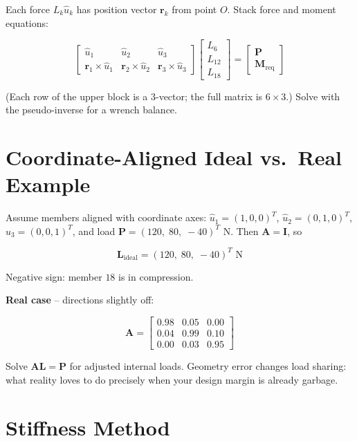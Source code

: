 \documentclass[11pt, letterpaper]{article}
\newcommand{\bL}{\mathbf{L}}
\newcommand{\bA}{\mathbf{A}}
\newcommand{\bP}{\mathbf{P}}
\begin{document}
Each force $L_k\hat{u}_k$ has position vector $\mathbf{r}_k$ from point $O$.
Stack force and moment equations:

\[
\begin{bmatrix}
  \hat{u}_1 & \hat{u}_2 & \hat{u}_3 \\[4pt]
  \mathbf{r}_1\times\hat{u}_1 & \mathbf{r}_2\times\hat{u}_2 & \mathbf{r}_3\times\hat{u}_3
\end{bmatrix}
\begin{bmatrix} L_6 \\ L_{12} \\ L_{18} \end{bmatrix}
=
\begin{bmatrix} \bP \\ \mathbf{M}_{\mathrm{req}} \end{bmatrix}
\]

\noindent
(Each row of the upper block is a $3$-vector; the full matrix is $6\times3$.)
Solve with the pseudo-inverse for a wrench balance.

\section{Coordinate-Aligned Ideal vs.\ Real Example}

Assume members aligned with coordinate axes:
$\hat{u}_1=(1,0,0)^T$, $\hat{u}_2=(0,1,0)^T$, $\hat{u}_3=(0,0,1)^T$, and load
$\bP=(120,\;80,\;-40)^T$ N. Then $\bA = \mathbf{I}$, so

\[
\bL_{\mathrm{ideal}} = (120,\;80,\;-40)^T \text{ N}
\]

\noindent
Negative sign: member $18$ is in compression.

\medskip\noindent
\textbf{Real case} -- directions slightly off:

\[
\bA = \begin{bmatrix}
0.98 & 0.05 & 0.00\\
0.04 & 0.99 & 0.10\\
0.00 & 0.03 & 0.95
\end{bmatrix}
\]

Solve $\bA\bL=\bP$ for adjusted internal loads.
Geometry error changes load sharing: what reality loves to do precisely
when your design margin is already garbage.

\section{Stiffness Method}
\end{document}
